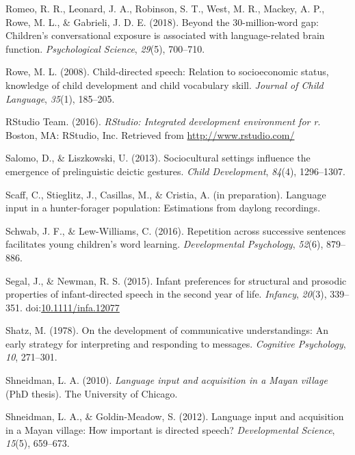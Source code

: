 \documentclass[floatsintext,man]{apa6}
\theoremstyle{definition}
\theoremstyle{definition}
\theoremstyle{definition}
\theoremstyle{remark}
\begin{document}
\hypertarget{ref-romeo2018beyond}{}
Romeo, R. R., Leonard, J. A., Robinson, S. T., West, M. R., Mackey, A.
P., Rowe, M. L., \& Gabrieli, J. D. E. (2018). Beyond the
30-million-word gap: Children's conversational exposure is associated
with language-related brain function. \emph{Psychological Science},
\emph{29}(5), 700--710.

\hypertarget{ref-rowe2008child}{}
Rowe, M. L. (2008). Child-directed speech: Relation to socioeconomic
status, knowledge of child development and child vocabulary skill.
\emph{Journal of Child Language}, \emph{35}(1), 185--205.

\hypertarget{ref-R-studio}{}
RStudio Team. (2016). \emph{RStudio: Integrated development environment
for r}. Boston, MA: RStudio, Inc. Retrieved from
\url{http://www.rstudio.com/}

\hypertarget{ref-salomo2013sociocultural}{}
Salomo, D., \& Liszkowski, U. (2013). Sociocultural settings influence
the emergence of prelinguistic deictic gestures. \emph{Child
Development}, \emph{84}(4), 1296--1307.

\hypertarget{ref-scaffIPlanguage}{}
Scaff, C., Stieglitz, J., Casillas, M., \& Cristia, A. (in preparation).
Language input in a hunter-forager population: Estimations from daylong
recordings.

\hypertarget{ref-schwab2016repetition}{}
Schwab, J. F., \& Lew-Williams, C. (2016). Repetition across successive
sentences facilitates young children's word learning.
\emph{Developmental Psychology}, \emph{52}(6), 879--886.

\hypertarget{ref-segal2015infant}{}
Segal, J., \& Newman, R. S. (2015). Infant preferences for structural
and prosodic properties of infant-directed speech in the second year of
life. \emph{Infancy}, \emph{20}(3), 339--351.
doi:\href{https://doi.org/10.1111/infa.12077}{10.1111/infa.12077}

\hypertarget{ref-shatz1978development}{}
Shatz, M. (1978). On the development of communicative understandings: An
early strategy for interpreting and responding to messages.
\emph{Cognitive Psychology}, \emph{10}, 271--301.

\hypertarget{ref-shneidman2010language}{}
Shneidman, L. A. (2010). \emph{Language input and acquisition in a Mayan
village} (PhD thesis). The University of Chicago.

\hypertarget{ref-shneidman2012language}{}
Shneidman, L. A., \& Goldin-Meadow, S. (2012). Language input and
acquisition in a Mayan village: How important is directed speech?
\emph{Developmental Science}, \emph{15}(5), 659--673.
\end{document}
